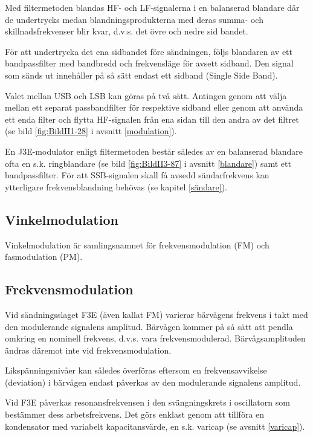 
Med filtermetoden blandas HF- och LF-signalerna i en balanserad
blandare där de undertrycks medan blandningsprodukterna med deras
summa- och skillnadsfrekvenser blir kvar, d.v.s. det övre och nedre
sid bandet.

För att undertrycka det ena sidbandet före sändningen, följs blandaren
av ett bandpassfilter med bandbredd och frekvensläge för avsett
sidband. Den signal som sänds ut innehåller på så sätt endast ett
sidband (Single Side Band).

Valet mellan USB och LSB kan göras på två sätt. Antingen genom att
välja mellan ett separat passbandfilter för respektive sidband eller
genom att använda ett enda filter och flytta HF-signalen från ena
sidan till den andra av det filtret (se bild \ref{fig:BildII1-28} i
avsnitt \ref{modulation}).

En J3E-modulator enligt filtermetoden består således av en balanserad
blandare ofta en s.k. ringblandare (se bild \ref{fig:BildII3-87} i avsnitt
\ref{blandare}) samt ett bandpassfilter.  För att SSB-signalen skall få avsedd
sändarfrekvens kan ytterligare frekvensblandning behövas (se kapitel
\ref{sändare}).

\subsection{Vinkelmodulation}

Vinkelmodulation är samlingsnamnet för frekvensmodulation (FM) och
fasmodulation (PM).

\subsection{Frekvensmodulation}

Vid sändningsslaget F3E (även kallat FM) varierar bärvågens frekvens i
takt med den modulerande signalens amplitud. Bärvågen kommer på så
sätt att pendla omkring en nominell frekvens, d.v.s. vara
frekvensmodulerad. Bärvågsamplituden ändras däremot inte vid
frekvensmodulation.

Likspänningsnivåer kan således överföras eftersom en frekvensavvikelse
(deviation) i bärvågen endast påverkas av den modulerande signalens
amplitud.

Vid F3E påverkas resonansfrekvensen i den svängningskrets i
oscillatorn som bestämmer dess arbetsfrekvens. Det görs enklast genom
att tillföra en kondensator med variabelt kapacitansvärde, en
s.k. varicap (se avsnitt \ref{varicap}).


